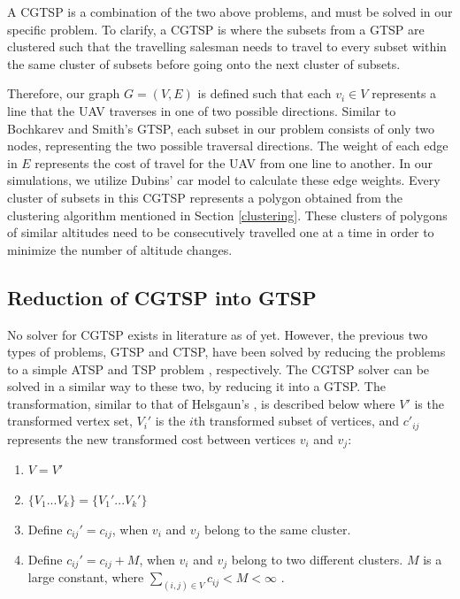 \documentclass[conference]{IEEEtran}
\theoremstyle{plain}%
\begin{document}
A CGTSP is a combination of the two above problems, and must be solved in our specific problem. To clarify, a CGTSP is where the subsets from a GTSP are clustered such that the travelling salesman needs to travel to every subset within the same cluster of subsets before going onto the next cluster of subsets.

Therefore, our graph $G = (V, E)$ is defined such that each $v_i \in V$ represents a line that the UAV traverses in one of two possible directions. Similar to Bochkarev and Smith's GTSP, each subset in our problem consists of only two nodes, representing the two possible traversal directions. The weight of each edge in $E$ represents the cost of travel for the UAV from one line to another. In our simulations, we utilize Dubins' car model to calculate these edge weights. Every cluster of subsets in this CGTSP represents a polygon obtained from the clustering algorithm mentioned in Section \ref{clustering}. These clusters of polygons of similar altitudes need to be consecutively travelled one at a time in order to minimize the number of altitude changes.

\subsection{Reduction of CGTSP into GTSP}

No solver for CGTSP exists in literature as of yet. However, the previous two types of problems, GTSP and CTSP, have been solved by reducing the problems to a simple ATSP \cite{helsgaun2015solving} and TSP problem \cite{helsgaun2011solving}, respectively. The CGTSP solver can be solved in a similar way to these two, by reducing it into a GTSP. The transformation, similar to that of Helsgaun's \cite{helsgaun2011solving}, is described below where $V'$ is the transformed vertex set, $V_i'$ is the $i$th transformed subset of vertices, and $c'_{ij}$ represents the new transformed cost between vertices $v_i$ and $v_j$:

\begin{enumerate}[label=(\alph*)]
\item $V = V'$
\item $\{V_1...V_k\} = \{V_1'...V_k'\}$
\item Define $c_{ij}' = c_{ij}$, when $v_i$ and $v_j$ belong to the same cluster.
\item Define $c_{ij}' = c_{ij} + M$, when $v_i$ and $v_j$ belong to two different clusters. $M$ is a large constant, where $\sum_{(i,j) \in V} c_{ij} < M < \infty$ \cite{noon1993efficient}.
\end{enumerate}
\end{document}
